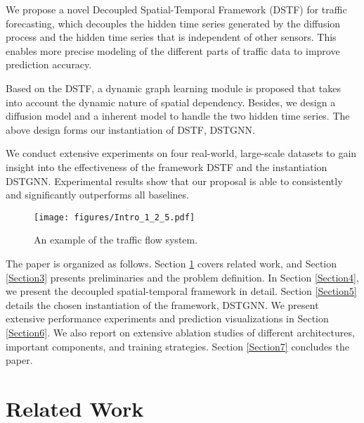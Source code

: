 \documentclass[sigconf, nonacm]{acmart}
\begin{document}
\begin{itemize}
    \item 
    {\color{black}We propose a novel Decoupled Spatial-Temporal Framework (DSTF) for traffic forecasting, which decouples the hidden time series generated by the diffusion process and the hidden time series that is independent of other sensors.
    This enables more precise modeling of the different parts of traffic data to improve prediction accuracy.
    \item
    Based on the DSTF, a dynamic graph learning module is proposed that takes into account the dynamic nature of spatial dependency.
    Besides, we design a diffusion model and a inherent model to handle the two hidden time series.
    The above design forms our instantiation of DSTF, DSTGNN.}
    
    \item We conduct extensive experiments on four real-world, large-scale datasets to gain insight into the effectiveness of {\color{black}the framework DSTF and the instantiation DSTGNN}. 
    Experimental results show that our proposal is able to consistently {\color{black}and significantly} outperforms all baselines.
\end{itemize}

\begin{figure}[t]
  \centering
\texttt{[image: figures/Intro\_1\_2\_5.pdf]}
  \caption{\color{black}An example of the traffic flow system.
  }
  \label{Intro1}
\end{figure}


The paper is organized as follows.
Section \ref{Section2} covers related work, and Section \ref{Section3} presents preliminaries and the problem definition.
In Section \ref{Section4}, we present the decoupled spatial-temporal framework in detail.
Section \ref{Section5} details the chosen instantiation of the framework, DSTGNN.
We {\color{black}present extensive performance experiments and prediction visualizations in Section \ref{Section6}. 
We also report on extensive ablation studies of different architectures, important components, and training strategies.}
Section \ref{Section7} concludes the paper. \section{Related Work}
\label{Section2}
\end{document}
